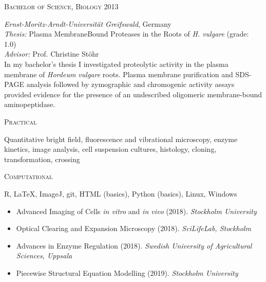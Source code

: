 \documentclass[11pt]{article}
\begin{document}
\textsc{\large{Bachelor of Science, Biology} \hfill \textsc{2013}}
\begin{addmargin}[24pt]{0pt}
	\textit{Ernst-Moritz-Arndt-Universität Greifswald}, Germany \\
	\textit{Thesis:} Plasma Membrane\textendash Bound Proteases in the Roots of \textit{H. vulgare} (grade: \textsc{1.0}) \\
	\textit{Advisor:} Prof. Christine Stöhr
	\vspace{0.1cm} \\
	\small{In my bachelor's thesis I investigated proteolytic activity in the plasma membrane of \textit{Hordeum vulgare} roots. Plasma membrane purification and SDS-PAGE analysis followed by zymographic and chromogenic activity assays provided evidence for the presence of an undescribed oligomeric membrane-bound aminopeptidase.}
\end{addmargin}
\vspace{0.5cm}

\newpage


\textsc{\large{Practical}} 
\begin{addmargin}[24pt]{0pt}
	Quantitative bright field, fluorescence and vibrational microscopy, enzyme kinetics, image analysis, cell suspension cultures, histology, cloning, transformation, crossing
\end{addmargin}
\vspace{0.2cm}

\textsc{\large{Computational}} 
\begin{addmargin}[24pt]{0pt}
	R, LaTeX, ImageJ, git, HTML (basics), Python (basics), Linux, Windows
\end{addmargin}	
\vspace{0.5cm}

\vspace{-0.175cm}
\begin{itemize}[label={},itemindent=-9pt,leftmargin=24pt]
	\itemsep-0.1cm
	\item Advanced Imaging of Cells \textit{in vitro} and \textit{in vivo} (2018). \textit{Stockholm University} 
	\item Optical Clearing and Expansion Microscopy (2018). \textit{SciLifeLab, Stockholm} 	
	\item Advances in Enzyme Regulation (2018). \textit{Swedish University of Agricultural Sciences, Uppsala} 
	\item Piecewise Structural Equation Modelling (2019). \textit{Stockholm University}
\end{itemize}
\vspace{0.3cm}
\end{document}
